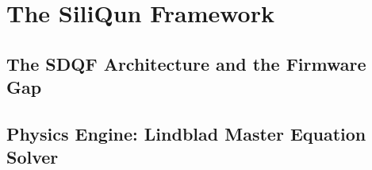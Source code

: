\documentclass[twocolumn]{article}
\begin{document}
%
%
%
%
%
\section{The SiliQun Framework}

\subsection{The SDQF Architecture and the Firmware Gap}

\subsection{Physics Engine: Lindblad Master Equation Solver}
\end{document}
